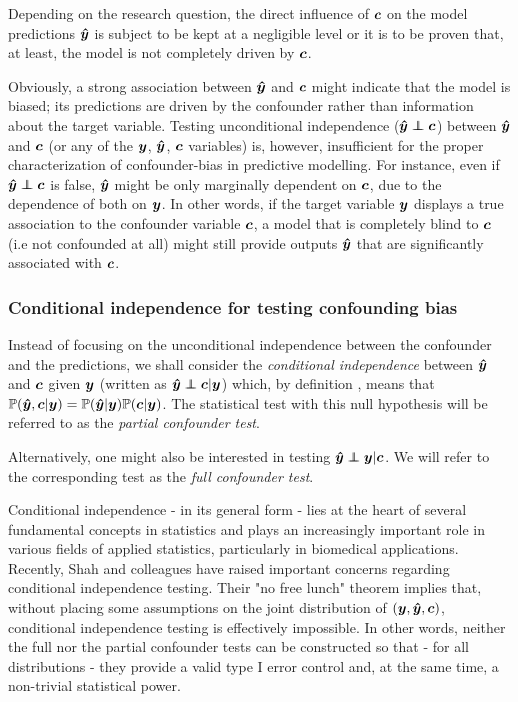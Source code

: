 \documentclass{article}
\begin{document}
Depending on the research question, the direct influence of $\boldsymbol{c}$ on the model predictions $\boldsymbol{\hat{y}}$ is subject to be kept at a negligible level or it is to be proven that, at least, the model is not completely driven by $\boldsymbol{c}$.

Obviously, a strong association between $\boldsymbol{\hat{y}}$ and $\boldsymbol{c}$ might indicate that the model is biased; its predictions are driven by the confounder rather than information about the target variable.
Testing unconditional independence ($\yhat \independent \c$) between $\boldsymbol{\hat{y}}$ and $\boldsymbol{c}$ (or any of the $\boldsymbol{y}$, $\boldsymbol{\hat{y}}$, $\boldsymbol{c}$ variables) is, however, insufficient for the proper characterization of confounder-bias in predictive modelling.
For instance, even if $\yhat \independent \c$ is false, $\boldsymbol{\hat{y}}$ might be only marginally dependent on $\boldsymbol{c}$, due to the dependence of both on $\boldsymbol{y}$. In other words, if the target variable $\boldsymbol{y}$ displays a true association to the confounder variable $\boldsymbol{c}$, a model that is completely blind to $\boldsymbol{c}$ (i.e not confounded at all) might still provide outputs $\boldsymbol{\hat{y}}$ that are significantly associated with $\boldsymbol{c}$.

\subsubsection*{Conditional independence for testing confounding bias}

Instead of focusing on the unconditional independence between the confounder and the predictions, we shall consider the \emph{conditional independence} between $\boldsymbol{\hat{y}}$ and $\boldsymbol{c}$ given $\boldsymbol{y}$ (written as $\yhat \independent \c | \y$) which, by definition \citep{dawid1979conditional}, means that $\mathbb{P}(\boldsymbol{\hat{y}}, \boldsymbol{c}|\boldsymbol{y}) = \mathbb{P}(\boldsymbol{\hat{y}}|\boldsymbol{y})\mathbb{P}(\boldsymbol{c}|\boldsymbol{y})$. The statistical test with this null hypothesis will be referred to as the \emph{partial confounder test}.

Alternatively, one might also be interested in testing $\yhat \independent \y | \c$. We will refer to the corresponding test as the \emph{full confounder test}.

 Conditional independence - in its general form - lies at the heart of several fundamental concepts in statistics and  plays an increasingly important role in various fields of applied statistics, particularly in biomedical applications\citep{spirtes2000causation, fiedler2011mediation, peters2016causal, candes2016panning}. Recently, Shah and colleagues\cite{shah2020hardness} have raised important concerns regarding conditional independence testing.
 Their "no free lunch" theorem implies that, without placing some assumptions on the joint distribution of $(\boldsymbol{y}, \boldsymbol{\hat{y}}, \boldsymbol{c})$, conditional independence testing is effectively impossible. In other words, neither the full nor the partial confounder tests can be constructed so that - for all distributions - they provide a valid type I error control and, at the same time, a non-trivial statistical power.
\end{document}

